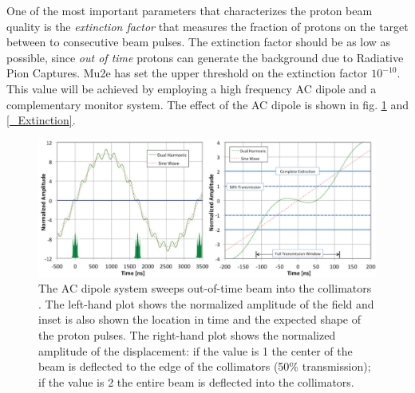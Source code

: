 \documentclass[12pt,a4paper,openright, oneside, titlepage]{book} %
\begin{document}
\noindent 
One of the most important parameters that characterizes the proton beam quality is the 
\textit{extinction factor} that measures the fraction of protons on the
target between to consecutive beam pulses. The extinction factor should be 
as low as possible, since \textit{out of time} protons can generate the background due to Radiative Pion Captures. 
Mu2e has set the upper threshold on the extinction factor $10^{-10}$. 
This value will be achieved by employing a high frequency AC dipole and a complementary monitor system. The effect of the AC dipole is shown in fig. \ref{_AC_dipole} and \ref{_Extinction}.\\

\begin{figure}[h!]
\centering
\includegraphics[scale=0.5]{AC_dipole}
\caption[AC dipole extinction]{The AC dipole system sweeps out-of-time beam into the collimators \cite{bob_mu2e}. 
The left-hand plot shows the normalized amplitude of the field and inset is also shown
the location in time and the expected shape of the proton pulses. 
The right-hand plot shows the normalized amplitude of the displacement: 
if the value is 1 the center of the beam is deflected to the edge of the collimators (50\% transmission); 
if the value is 2 the entire beam is deflected into the collimators.}
\label{_AC_dipole}
\end{figure}
\end{document}
